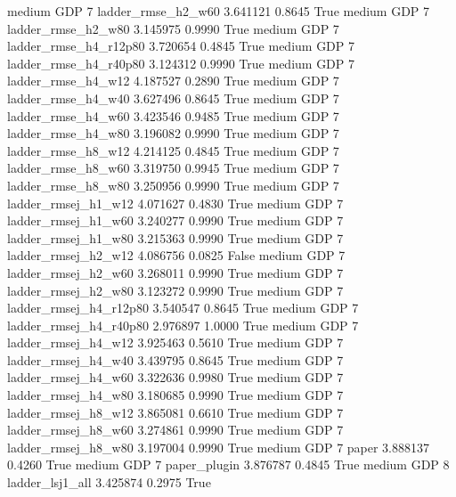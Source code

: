    medium      GDP                 7     ladder_rmse_h2_w60   3.641121      0.8645    True
    medium      GDP                 7     ladder_rmse_h2_w80   3.145975      0.9990    True
    medium      GDP                 7  ladder_rmse_h4_r12p80   3.720654      0.4845    True
    medium      GDP                 7  ladder_rmse_h4_r40p80   3.124312      0.9990    True
    medium      GDP                 7     ladder_rmse_h4_w12   4.187527      0.2890    True
    medium      GDP                 7     ladder_rmse_h4_w40   3.627496      0.8645    True
    medium      GDP                 7     ladder_rmse_h4_w60   3.423546      0.9485    True
    medium      GDP                 7     ladder_rmse_h4_w80   3.196082      0.9990    True
    medium      GDP                 7     ladder_rmse_h8_w12   4.214125      0.4845    True
    medium      GDP                 7     ladder_rmse_h8_w60   3.319750      0.9945    True
    medium      GDP                 7     ladder_rmse_h8_w80   3.250956      0.9990    True
    medium      GDP                 7    ladder_rmsej_h1_w12   4.071627      0.4830    True
    medium      GDP                 7    ladder_rmsej_h1_w60   3.240277      0.9990    True
    medium      GDP                 7    ladder_rmsej_h1_w80   3.215363      0.9990    True
    medium      GDP                 7    ladder_rmsej_h2_w12   4.086756      0.0825   False
    medium      GDP                 7    ladder_rmsej_h2_w60   3.268011      0.9990    True
    medium      GDP                 7    ladder_rmsej_h2_w80   3.123272      0.9990    True
    medium      GDP                 7 ladder_rmsej_h4_r12p80   3.540547      0.8645    True
    medium      GDP                 7 ladder_rmsej_h4_r40p80   2.976897      1.0000    True
    medium      GDP                 7    ladder_rmsej_h4_w12   3.925463      0.5610    True
    medium      GDP                 7    ladder_rmsej_h4_w40   3.439795      0.8645    True
    medium      GDP                 7    ladder_rmsej_h4_w60   3.322636      0.9980    True
    medium      GDP                 7    ladder_rmsej_h4_w80   3.180685      0.9990    True
    medium      GDP                 7    ladder_rmsej_h8_w12   3.865081      0.6610    True
    medium      GDP                 7    ladder_rmsej_h8_w60   3.274861      0.9990    True
    medium      GDP                 7    ladder_rmsej_h8_w80   3.197004      0.9990    True
    medium      GDP                 7                  paper   3.888137      0.4260    True
    medium      GDP                 7           paper_plugin   3.876787      0.4845    True
    medium      GDP                 8        ladder_lsj1_all   3.425874      0.2975    True
